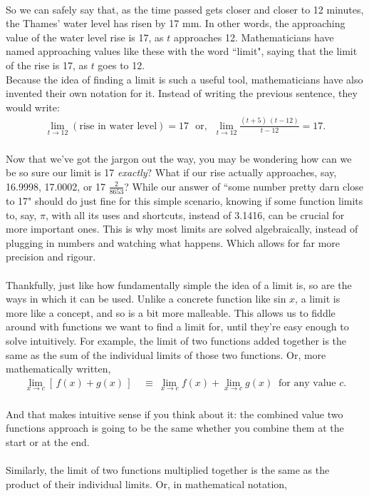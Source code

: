 \documentclass[11pt]{article}
\numberwithin{equation}{section}
\begin{document}
\\ So we can safely say that, as the time passed gets closer and closer to 12 minutes, the Thames' water level has risen by 17 mm. In other words, the approaching value of the water level rise is 17, as \(t\) approaches 12. Mathematicians have named approaching values like these with the word ``limit", saying that the limit of the rise is 17, as \(t\) goes to 12.
\\ Because the idea of finding a limit is such a useful tool, mathematicians have also invented their own notation for it. Instead of writing the previous sentence, they would write:
\begin{align*}
\lim_{t \to 12} \left(\textrm{rise in water level}\right) = 17 \ \ \ \textrm{or,} \ \ \ \lim_{t \to 12} \frac{(t + 5) \ (t - 12)}{t - 12} = 17.
\end{align*}
\\ Now that we've got the jargon out the way, you may be wondering how can we be so sure our limit is 17 \textit{exactly}? What if our rise actually approaches, say, 16.9998, 17.0002, or 17 \(\frac{2}{8653}\)? While our answer of ``some number pretty darn close to 17" should do just fine for this simple scenario, knowing if some function limits to, say, \(\pi\), with all its uses and shortcuts, instead of 3.1416, can be crucial for more important ones. This is why most limits are solved algebraically, instead of plugging in numbers and watching what happens. Which allows for far more precision and rigour.  
\\ \\ Thankfully, just like how fundamentally simple the idea of a limit is, so are the ways in which it can be used. Unlike a concrete function like sin \(x\), a limit is more like a concept, and so is a bit more malleable. This allows us to fiddle around with functions we want to find a limit for, until they're easy enough to solve intuitively. For example, the limit of two functions added together is the same as the sum of the individual limits of those two functions. Or, more mathematically written,
\begin{align*}
\lim_{x \to c} \left[ \, f(x) + g(x) \, \right] \ &\equiv \ \lim_{x \to c} f(x) + \lim_{x \to c} g(x) \ \textrm{ for any value } c.
\end{align*}
\\ And that makes intuitive sense if you think about it: the combined value two functions approach is going to be the same whether you combine them at the start or at the end.
\\ \\ Similarly, the limit of two functions multiplied together is the same as the product of their individual limits. Or, in mathematical notation,
\end{document}
